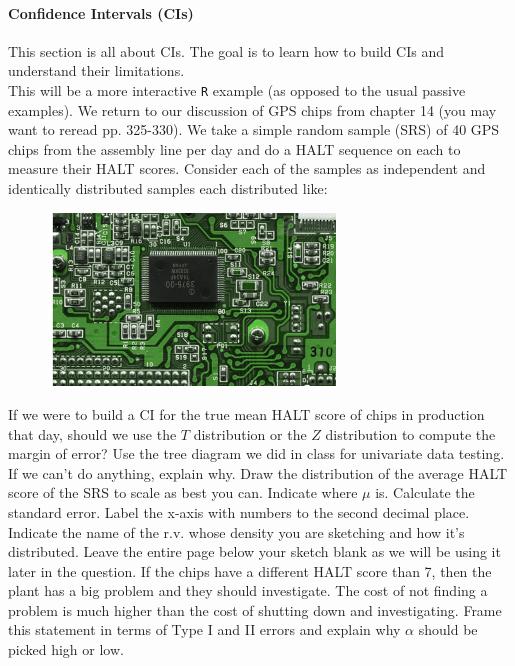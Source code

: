 \documentclass[12pt]{article}
\begin{document}
\paragraph{Confidence Intervals (CIs)} This section is all about CIs. The goal is to learn how to build CIs and understand their limitations. \\

\problem This will be a more interactive \texttt{R} example (as opposed to the usual passive examples). We return to our discussion of GPS chips from chapter 14 (you may want to reread pp. 325-330). We take a simple random sample (SRS) of 40 GPS chips from the assembly line per day and do a HALT sequence on each to measure their HALT scores. Consider each of the samples as independent and identically distributed samples each distributed like:

\beqn
\Xoneton \iid {}
\eeqn 

\begin{figure}[htp]
\centering
\includegraphics[width=3in, height=1.81in]{microchips.jpg}
\end{figure}
\FloatBarrier

\benum
\intermediatesubproblem If we were to build a CI for the true mean HALT score of chips in production that day, should we use the $T$ distribution or the $Z$ distribution to compute the margin of error? Use the tree diagram we did in class for univariate data testing. If we can't do anything, explain why.
\easysubproblem Draw the distribution of the average HALT score of the SRS to scale as best you can. Indicate where $\mu$ is. Calculate the standard error. Label the x-axis with numbers to the second decimal place. Indicate the name of the r.v. whose density you are sketching and how it's distributed. Leave the entire page below your sketch blank as we will be using it later in the question.
\easysubproblem If the chips have a different HALT score than 7, then the plant has a big problem and they should investigate. The cost of not finding a problem is much higher than the cost of shutting down and investigating. Frame this statement in terms of Type I and II errors and explain why $\alpha$ should be picked high or low.
\end{document}
